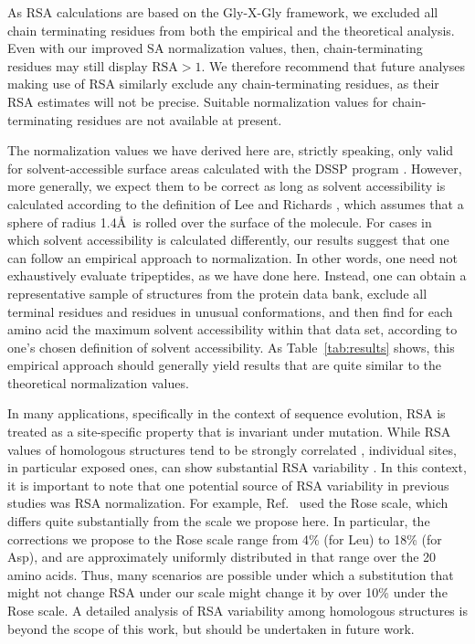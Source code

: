 \documentclass[11pt]{article}
\begin{document}
As RSA calculations are based on the Gly-X-Gly framework, we excluded all chain terminating residues from both the empirical and the theoretical analysis. Even with our improved SA normalization values, then, chain-terminating residues may still display $\text{RSA}>1$. We therefore recommend that future analyses making use of RSA similarly exclude any chain-terminating residues, as their RSA estimates will not be precise. Suitable normalization values for chain-terminating residues are not available at present. 

The normalization values we have derived here are, strictly speaking, only valid for solvent-accessible surface areas calculated with the DSSP program \cite{Kabsch1983}. However, more generally, we expect them to be correct as long as solvent accessibility is calculated according to the definition of Lee and Richards \cite{LeeRichards1971}, which assumes that a sphere of radius 1.4\AA\ is rolled over the surface of the molecule. For cases in which solvent accessibility is calculated differently, our results suggest that one can follow an empirical approach to normalization. In other words, one need not exhaustively evaluate tripeptides, as we have done here. Instead, one can obtain a representative sample of structures from the protein data bank, exclude all terminal residues and residues in unusual conformations, and then find for each amino acid the maximum solvent accessibility within that data set, according to one's chosen definition of solvent accessibility. As Table~\ref{tab:results} shows, this empirical approach should generally yield results that are quite similar to the theoretical normalization values.

In many applications, specifically in the context of sequence evolution, RSA is treated as a site-specific property that is invariant under mutation. While RSA values of homologous structures tend to be strongly correlated \cite{RostSander1994,Zhouetal2009}, individual sites, in particular exposed ones, can show substantial RSA variability \cite{RostSander1994}. In this context, it is important to note that one potential source of RSA variability in previous studies was RSA normalization. For example, Ref.~\cite{RostSander1994} used the Rose scale, which differs quite substantially from the scale we propose here. In particular, the corrections we propose to the Rose scale range from 4\% (for Leu) to 18\% (for Asp), and are approximately uniformly distributed in that range over the 20 amino acids. Thus, many scenarios are possible under which a substitution that might not change RSA under our scale might change it by over 10\% under the Rose scale. A detailed analysis of RSA variability among homologous structures is beyond the scope of this work, but should be undertaken in future work.
\end{document}
